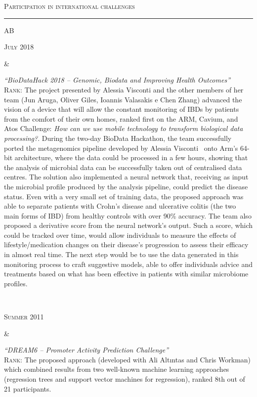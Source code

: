 \documentclass[a4paper,10pt]{article}
\newcommand{\mediumtitle}[1]{
	\vspace{0.2cm}
	{\noindent
	\Large \textsc{#1}\\[-2ex]
	\hrule
	\vspace{0.2cm}}
}
\newenvironment{doubletablelist}
{
	\vspace{-0.2cm}
	\begin{longtable}[!h]{AB}}{\end{longtable}
}
\newcommand{\dtlist}[2]{
\hspace{-3cm}
\noindent
	\begin{minipage}{0.22\textwidth}
	\begin{flushright}
	\textsc{#1}
	\end{flushright}
	\end{minipage}
	& #2\\[0.2cm]
}
\begin{document}
\vspace{0.2cm}




\mediumtitle{Participation in international challenges}

\begin{doubletablelist}
\vspace{-0.1cm}
\dtlist{July 2018}{\begin{minipage}[t]{0.65\textwidth}
			\emph{``BioDataHack 2018 -- Genomic, Biodata and Improving Health Outcomes''}\\
			\textsc{Rank:} The project presented by Alessia Visconti and the other members of her team (Jun Aruga, Oliver Giles, Ioannis Valasakis e Chen Zhang) advanced the vision of a device that will allow the constant monitoring of IBDs by patients from the comfort of their own homes, ranked first on the ARM, Cavium, and Atos Challenge: \emph{How can we use mobile technology to transform biological data processing?}. During the two-day BioData Hackathon, the team successfully ported the metagenomics pipeline developed by Alessia Visconti~\cite{Vis18b} onto Arm’s 64-bit architecture, where the data could be processed in a few hours, showing that the analysis of microbial data can be successfully taken out of centralised data centres. The solution also implemented a neural network that, receiving as input the microbial profile produced by the analysis pipeline, could predict the disease status. Even with a very small set of training data, the proposed approach was able to separate patients with Crohn's disease and ulcerative colitis (the two main forms of IBD) from healthy controls with over 90\% accuracy. The team also proposed a derivative score from the neural network’s output. Such a score, which could be tracked over time, would allow individuals to measure the effects of lifestyle/medication changes on their disease’s progression to assess their efficacy in almost real time. The next step would be to use the data generated in this monitoring process to craft suggestive models, able to offer individuals advice and treatments based on what has been effective in patients with similar microbiome profiles.
		\end{minipage}}

\dtlist{Summer 2011}{\begin{minipage}[t]{0.65\textwidth}
			\emph{``DREAM6 -- Promoter Activity Prediction Challenge''}\\
			\textsc{Rank:} The proposed approach (developed with Ali Altıntas and Chris Workman) which combined results from two well-known machine learning approaches (regression trees and support vector machines for regression), ranked 8th out of 21 participants.
		\end{minipage}}
		

\end{doubletablelist}
\end{document}
